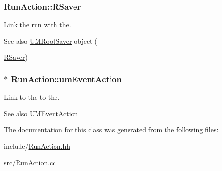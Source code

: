 \subsubsection[{R\+Saver}]{ Run\+Action\+::\+R\+Saver\hspace{0.3cm}{\ttfamily [private]}}\label{classRunAction_a6628a3f063d474237f3aa7167fff359e}


Link the run with the. 

\begin{DoxySeeAlso}{See also}
\hyperlink{classUMRootSaver}{U\+M\+Root\+Saver} object (

\hyperlink{classRunAction_a6628a3f063d474237f3aa7167fff359e}{R\+Saver}) 
\end{DoxySeeAlso}
\hypertarget{classRunAction_aa9cd1a37c94536b68ef616ea87dd48f7}{}
\subsubsection[{um\+Event\+Action}]{$\ast$ Run\+Action\+::um\+Event\+Action\hspace{0.3cm}{\ttfamily [private]}}\label{classRunAction_aa9cd1a37c94536b68ef616ea87dd48f7}


Link to the to the. 

\begin{DoxySeeAlso}{See also}
\hyperlink{classUMEventAction}{U\+M\+Event\+Action} 
\end{DoxySeeAlso}


The documentation for this class was generated from the following files\+:\begin{DoxyCompactItemize}
\item 
include/\hyperlink{RunAction_8hh}{Run\+Action.\+hh}\item 
src/\hyperlink{RunAction_8cc}{Run\+Action.\+cc}\end{DoxyCompactItemize}
